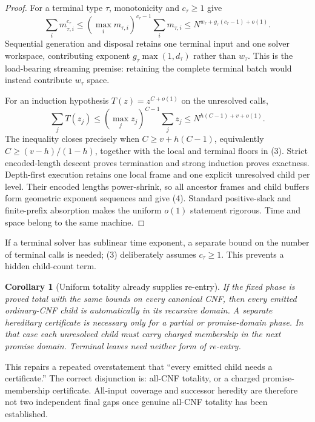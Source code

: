 \documentclass[11pt]{article}
\newtheorem{corollary}[theorem]{Corollary}
\begin{document}
\begin{proof}
For a terminal type $\tau$, monotonicity and $c_\tau\ge1$ give
\[
 \sum_i m_{\tau,i}^{c_\tau}
 \le \left(\max_i m_{\tau,i}\right)^{c_\tau-1}
       \sum_i m_{\tau,i}
 \le N^{w_\tau+g_\tau(c_\tau-1)+o(1)}.                 \tag{5}
\]
Sequential generation and disposal retains one terminal input and one
solver workspace, contributing exponent
$g_\tau\max(1,d_\tau)$ rather than $w_\tau$.  This is the load-bearing
streaming premise: retaining the complete terminal batch would instead
contribute $w_\tau$ space.

For an induction hypothesis $T(z)=z^{C+o(1)}$ on the unresolved calls,
\[
 \sum_j T(z_j)
 \le (\max_j z_j)^{C-1}\sum_j z_j
 \le N^{h(C-1)+v+o(1)}.                                 \tag{6}
\]
The inequality closes precisely when $C\ge v+h(C-1)$, equivalently
$C\ge(v-h)/(1-h)$, together with the local and terminal floors in (3).
Strict encoded-length descent proves termination and strong induction proves
exactness.  Depth-first execution retains one local frame and one explicit
unresolved child per level.  Their encoded lengths power-shrink, so all
ancestor frames and child buffers form geometric exponent sequences and give
(4).  Standard positive-slack and finite-prefix absorption makes the uniform
$o(1)$ statement rigorous.  Time and space belong to the same machine.
\end{proof}

If a terminal solver has sublinear time exponent, a separate bound on the
number of terminal calls is needed; (3) deliberately assumes
$c_\tau\ge1$.  This prevents a hidden child-count term.

\begin{corollary}[Uniform totality already supplies re-entry]
If the fixed phase is proved total with the same bounds on every canonical
CNF, then every emitted ordinary-CNF child is automatically in its recursive
domain.  A separate hereditary certificate is necessary only for a partial
or promise-domain phase.  In that case each unresolved child must carry
charged membership in the next promise domain.  Terminal leaves need neither
form of re-entry.
\end{corollary}

This repairs a repeated overstatement that ``every emitted child needs a
certificate.''  The correct disjunction is: all-CNF totality, or a charged
promise-membership certificate.  All-input coverage and successor heredity
are therefore not two independent final gaps once genuine all-CNF totality
has been established.
\end{document}
